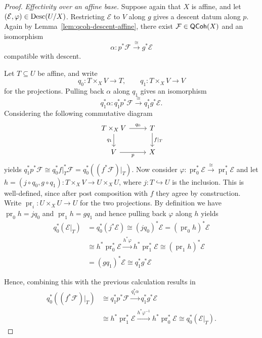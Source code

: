 \begin{proof}
	\emph{Effectivity over an affine base.}
	Suppose again that $X$ is affine, and let
	$(\mathcal{E},\varphi)\in\operatorname{Desc}(U/X)$.
	Restricting $\mathcal{E}$ to $V$ along $g$ gives a descent datum along $p$. Again by Lemma~\ref{lem:qcoh-descent-affine}, there exist
	$\mathcal{F}\in\mathsf{QCoh}(X)$ and an isomorphism
	\[
	\alpha:p^*\mathcal{F}\xrightarrow{\cong}g^*\mathcal{E}
	\]
	compatible with descent.
	
	Let $T\subseteq U$ be affine, and write
	\[
	q_0:T\times_X V\to T,
	\qquad
	q_1:T\times_X V\to V
	\]
	for the projections.
	Pulling back $\alpha$ along $q_1$ gives an isomorphism 
	\[
		q_1^*\alpha: q_1^*p^*\mathcal{F}\xrightarrow{\cong} q_1^*g^*\mathcal{E}.
	\]
	Considering the following commutative diagram
	\[\begin{tikzcd}
		{T\times_XV} & T \\
		V & X
		\arrow["{q_0}", from=1-1, to=1-2]
		\arrow["{q_1}"', from=1-1, to=2-1]
		\arrow["{f|_T}", from=1-2, to=2-2]
		\arrow["p"', from=2-1, to=2-2]
	\end{tikzcd}\]
	yields $q_1^*p^*\mathcal{F} \cong q_0^*f|_T^*\mathcal{F} = q_0^*((f^*\mathcal{F})|_T)$.
	Now consider $\varphi: \operatorname{pr}_0^*\mathcal{E} \xrightarrow{\cong}\operatorname{pr}_1^*\mathcal{E}$ and let
	$h = (j\circ q_0, g\circ q_1): T\times_X V \to U\times_X U$, where $j: T\hookrightarrow U$ is the inclusion. This is well-defined, since after post composition with $f$ they agree by construction. Write $\operatorname{pr}_i: U\times_X U \to U$ for the two projections. By definition we have $\operatorname{pr}_0h = jq_0$ and $\operatorname{pr}_1h=gq_1$ and hence pulling back $\varphi$ along $h$ yields
	\begin{align*}
		q_0^*(\mathcal{E}|_T) &= q_0^*(j^*\mathcal{E}) \cong (jq_0)^*\mathcal{E} = (\operatorname{pr}_0h)^*\mathcal{E} \\
		&\cong h^*\operatorname{pr}_0^*\mathcal{E} \xrightarrow{h^*\varphi} h^*\operatorname{pr}_1^*\mathcal{E} \cong (\operatorname{pr}_1h)^*\mathcal{E} \\
		&= (gq_1)^*\mathcal{E} \cong q_1^*g^*\mathcal{E}
	\end{align*}
	
	Hence, combining this with the previous calculation results in
	\begin{align*}
		q_0^*((f^*\mathcal{F})|_T) &\cong q_1^*p^*\mathcal{F} \xrightarrow{q_1^*\alpha} q_1^*g^*\mathcal{E} \\
		&\cong h^*\operatorname{pr}_1^*\mathcal{E} \xrightarrow{h^*\varphi^{-1}} h^*\operatorname{pr}_0^*\mathcal{E} \cong q_0^*(\mathcal{E}|_T). 
	\end{align*}


\end{proof}
